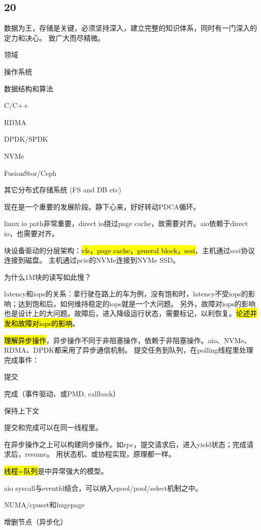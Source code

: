 \subsection{20}

数据为王，存储是关键，必须坚持深入，建立完整的知识体系，同时有一门深入的定力和决心。
致广大而尽精微。

领域
\begin{enumbox}
\item 操作系统
\item 数据结构和算法
\item C/C++
\item RDMA
\item DPDK/SPDK
\item NVMe
\item FusionStor/Ceph
\item 其它分布式存储系统 (FS and DB etc)
\end{enumbox}

现在是一个重要的发展阶段。静下心来，好好转动PDCA循环。

linux io path非常重要，direct io绕过page cache，故需要对齐。aio依赖于direct io，也需要对齐。

块设备驱动的分层架构：\hl{vfs，page cache，general block，scsi}，主机通过scsi协议连接到磁盘。
主机通过pcie的NVMe连接到NVMe SSD。

为什么1M块的读写如此慢？

latency和iops的关系：拿行驶在路上的车为例，没有饱和时，latency不受iops的影响；达到饱和后，如何维持稳定的iops就是一个大问题。
另外，故障对iops的影响也是设计上的大问题。故障后，进入降级运行状态，需要标记，以利恢复。\hl{论述并发和故障对iops的影响}。

\hl{理解异步操作}，异步操作不同于非阻塞操作，依赖于非阻塞操作。aio、NVMe、RDMA、DPDK都采用了异步通信机制。
提交任务到队列，在polling线程里处理完成事件：
\begin{enumbox}
\item 提交
\item 完成（事件驱动、或PMD, callback）
\item 保持上下文
\end{enumbox}

提交和完成可以在同一线程里。

在异步操作之上可以构建同步操作。如rpc，提交请求后，进入yield状态；完成请求后，resume。
用状态机、或协程实现，原理都一样。

\hl{线程+队列}是中异常强大的模型。

\begin{enumbox}
\item aio syscall与eventfd结合，可以纳入epool/pool/select机制之中。
\item NUMA/cpuset和hugepage
\item 增删节点（异步化）
\end{enumbox}

